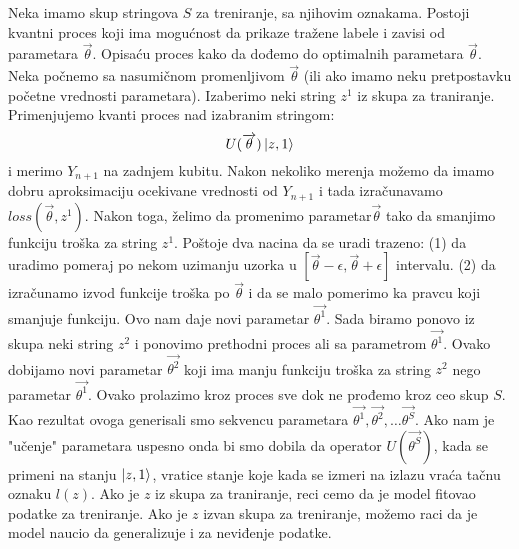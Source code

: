 \documentclass[12pt, letterpaper, oneside]{article}
\begin{document}
Neka imamo skup stringova \(S\) za treniranje, sa njihovim oznakama. Postoji kvantni proces koji ima mogućnost da
prikaze tražene labele i zavisi od parametara $\overrightarrow{\theta}$. Opisaću proces kako da dođemo do optimalnih parametara $\overrightarrow{\theta}$.
Neka počnemo sa nasumičnom promenljivom $\overrightarrow{\theta}$ (ili ako imamo neku pretpostavku početne vrednosti parametara). Izaberimo neki string $z^1$ iz skupa za traniranje.
Primenjujemo kvanti proces nad izabranim stringom:
\[
    U(\overrightarrow{\theta})\Ket{z,1}
\] 
i merimo $Y_{n+1}$ na zadnjem kubitu. Nakon nekoliko merenja možemo da imamo dobru aproksimaciju ocekivane vrednosti od $Y_{n+1}$
i tada izračunavamo $\mathit{loss}(\overrightarrow{\theta},z^1)$. Nakon toga, želimo da promenimo parametar$\overrightarrow{\theta}$ tako da smanjimo
funkciju troška za string $z^1$. Poštoje dva nacina da se uradi trazeno: (1) da uradimo pomeraj po nekom uzimanju uzorka u $[\overrightarrow{\theta}-\epsilon,\overrightarrow{\theta}+\epsilon]$ intervalu.
(2) da izračunamo izvod funkcije troška po $\overrightarrow{\theta}$ i da se malo pomerimo ka pravcu koji smanjuje funkciju.
Ovo nam daje novi parametar $\overrightarrow{\theta^1}$. Sada biramo ponovo iz skupa neki string $z^2$ i ponovimo prethodni proces ali sa parametrom $\overrightarrow{\theta^1}$.
Ovako dobijamo novi parametar $\overrightarrow{\theta^2}$ koji ima manju funkciju troška za string $z^2$ nego parametar $\overrightarrow{\theta^1}$.
Ovako prolazimo kroz proces sve dok ne prođemo kroz ceo skup $S$. Kao rezultat ovoga generisali smo sekvencu parametara
$\overrightarrow{\theta^1}, \overrightarrow{\theta^2}, \dots \overrightarrow{\theta^S}$. Ako nam je "učenje" parametara uspesno onda bi smo dobila
da operator $U(\overrightarrow{\theta^S})$, kada se primeni na stanju $\Ket{z,1}$, vratice stanje koje kada se izmeri na izlazu vraća tačnu oznaku $l(z)$.
Ako je $z$ iz skupa za traniranje, reci cemo da je model fitovao podatke za treniranje. Ako je $z$ izvan skupa za treniranje, možemo raci da je model naucio da generalizuje i za neviđenje podatke.
\end{document}
